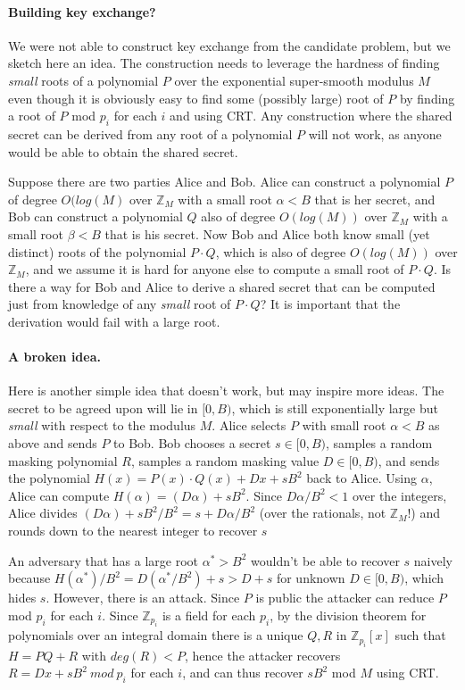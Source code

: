 \documentclass[letterpaper,twocolumn,10pt]{article}
\begin{document}
\paragraph{Building key exchange?} We were not able to construct key exchange from the candidate problem, but we sketch here an idea. The construction needs to leverage the hardness of finding \emph{small} roots of a polynomial $P$ over the exponential super-smooth modulus $M$ even though it is obviously easy to find some (possibly large) root of $P$ by finding a root of $P$ mod $p_i$ for each $i$ and using CRT. Any construction where the shared secret can be derived from any root of a polynomial $P$ will not work, as anyone would be able to obtain the shared secret. 

Suppose there are two parties Alice and Bob. Alice can construct a polynomial $P$ of degree $O(log(M)$ over $\mathbb{Z}_M$ with a small root $\alpha < B$ that is her secret, and Bob can construct a polynomial $Q$ also of degree $O(log(M))$ over $\mathbb{Z}_M$ with a small root $\beta < B$ that is his secret. Now Bob and Alice both know small (yet distinct) roots of the polynomial $P \cdot Q$, which is also of degree $O(log(M))$ over $\mathbb{Z}_M$, and we assume it is hard for anyone else to compute a small root of $P\cdot Q$. Is there a way for Bob and Alice to derive a shared secret that can be computed just from knowledge of any \emph{small} root of $P\cdot Q$? It is important that the derivation would fail with a large root. 

\paragraph{A broken idea.} Here is another simple idea that doesn't work, but may inspire more ideas. The secret to be agreed upon will lie in $[0, B)$, which is still exponentially large but \emph{small} with respect to the modulus $M$. Alice selects $P$ with small root $\alpha < B$ as above and sends $P$ to Bob. Bob chooses a secret $s \in [0, B)$, samples a random masking polynomial $R$, samples a random masking value $D \in [0, B)$, and sends the polynomial $H(x) = P(x) \cdot Q(x) + D x + sB^2$ back to Alice. Using $\alpha$, Alice can compute $H(\alpha) = (D \alpha) + sB^2$. Since $D\alpha/B^2 < 1$ over the integers, Alice divides $(D \alpha) + sB^2 / B^2 = s + D\alpha/B^2$ (over the rationals, not $\mathbb{Z}_M$!) and rounds down to the nearest integer to recover $s$

An adversary that has a large root $\alpha^* > B^2$ wouldn't be able to recover $s$ naively because $H(\alpha^*)/B^2 = D (\alpha^*/ B^2) + s > D + s$ for unknown $D \in [0, B)$, which hides $s$. However, there is an attack. Since $P$ is public the attacker can reduce $P$ mod $p_i$ for each $i$. Since $\mathbb{Z}_{p_i}$ is a field for each $p_i$, by the division theorem for polynomials over an integral domain there is a unique $Q, R$ in $\mathbb{Z}_{p_i}[x]$ such that $H = P Q + R$ with $deg(R) < P$, hence the attacker recovers $R = D x + sB^2 \ mod \ p_i$ for each $i$, and can thus recover $s B^2$ mod $M$ using CRT. 
 
\end{document}
